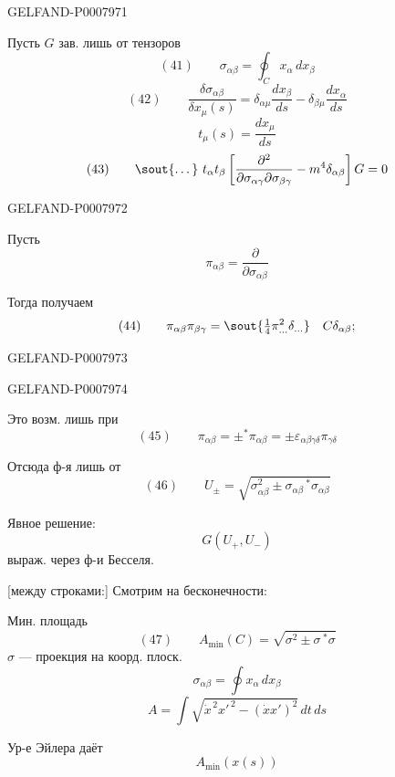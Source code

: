 \begin{GelfandAdjacentEvidence}{GELFAND-P000797}{1}

Пусть \(G\) зав. лишь от тензоров
\[
(41)\qquad \sigma_{\alpha\beta}=\oint_C x_\alpha\,dx_\beta
\]
\[
(42)\qquad \frac{\delta\sigma_{\alpha\beta}}{\delta x_\mu(s)}
=\delta_{\alpha\mu}\frac{dx_\beta}{ds}-\delta_{\beta\mu}\frac{dx_\alpha}{ds}
\]
\[
t_\mu(s)=\frac{dx_\mu}{ds}
\]
\[
(43)\qquad \text{\sout{\ldots}}\ t_\alpha t_\beta
\left[\frac{\partial^2}{\partial\sigma_{\alpha\gamma}\partial\sigma_{\beta\gamma}}
-m^4\delta_{\alpha\beta}\right]G=0
\]
\end{GelfandAdjacentEvidence}
\begin{GelfandAdjacentEvidence}{GELFAND-P000797}{2}


Пусть
\[
\pi_{\alpha\beta}=\frac{\partial}{\partial\sigma_{\alpha\beta}}
\]

Тогда получаем
\[
(44)\qquad \pi_{\alpha\beta}\pi_{\beta\gamma}
=\text{\sout{\(\tfrac14\pi^2_{\ldots}\delta_{\ldots}\)}}\quad C\delta_{\alpha\beta};
\]
\end{GelfandAdjacentEvidence}
\begin{GelfandAdjacentEvidence}{GELFAND-P000797}{3}

\end{GelfandAdjacentEvidence}
\begin{GelfandAdjacentEvidence}{GELFAND-P000797}{4}


Это возм. лишь при
\[
(45)\qquad \pi_{\alpha\beta}=\pm{}^*\pi_{\alpha\beta}
=\pm\varepsilon_{\alpha\beta\gamma\delta}\pi_{\gamma\delta}
\]

Отсюда ф-я лишь от
\[
(46)\qquad U_\pm=\sqrt{\sigma_{\alpha\beta}^2
\pm\sigma_{\alpha\beta}\,{}^*\sigma_{\alpha\beta}}
\]

Явное решение:
\[
G(U_+,U_-)
\]
выраж. через ф-и Бесселя.

[между строками:] Смотрим на бесконечности:

Мин. площадь
\[
(47)\qquad A_{\min}(C)=\sqrt{\sigma^2\pm\sigma\,{}^*\sigma}
\]
\(\sigma\) --- проекция на коорд. плоск.
\[
\sigma_{\alpha\beta}=\oint x_\alpha\,dx_\beta
\]
\[
A=\int\sqrt{\dot{x}^{\,2}x'^{\,2}-(\dot{x}x')^2}\,dt\,ds
\]

Ур-е Эйлера даёт
\[
A_{\min}(x(s))
\]
\end{GelfandAdjacentEvidence}



